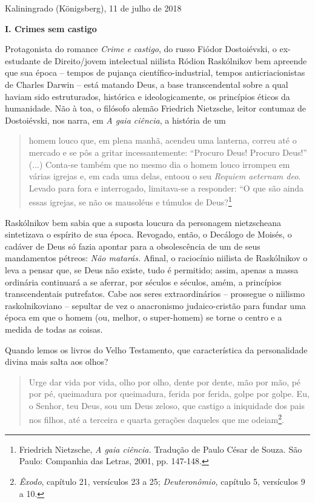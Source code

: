 \begin{flushright}
Kaliningrado (Königsberg), 11 de julho de 2018
\end{flushright}

\textbf{I. Crimes sem castigo}

Protagonista do romance \emph{Crime e castigo}, do russo Fiódor
Dostoiévski, o ex-estudante de Direito/jovem intelectual niilista Ródion
Raskólnikov bem apreende que sua época -- tempos de pujança
científico-industrial, tempos anticriacionistas de Charles Darwin --
está matando Deus, a base transcendental sobre a qual haviam sido
estruturados, histórica e ideologicamente, os princípios éticos da
humanidade. Não à toa, o filósofo alemão Friedrich Nietzsche, leitor
contumaz de Dostoiévski, nos narra, em \emph{A gaia ciência}, a história
de um

\begin{quote}
homem louco que, em plena manhã, acendeu uma lanterna, correu até o
mercado e se pôs a gritar incessantemente: ``Procuro Deus! Procuro
Deus!'' (...) Conta-se também que no mesmo dia o homem louco irrompeu em
várias igrejas e, em cada uma delas, entoou o seu \emph{Requiem aeternam
deo}. Levado para fora e interrogado, limitava-se a responder: ``O que
são ainda essas igrejas, se não os mausoléus e túmulos de
Deus?\footnote{Friedrich Nietzsche, \emph{A gaia ciência.} Tradução de
  Paulo César de Souza. São Paulo: Companhia das Letras, 2001, pp.
  147-148.}
\end{quote}

Raskólnikov bem sabia que a suposta loucura da personagem nietzscheana
sintetizava o espírito de sua época. Revogado, então, o Decálogo de
Moisés, o cadáver de Deus só fazia apontar para a obsolescência de um de
seus mandamentos pétreos: \emph{Não matarás.} Afinal, o raciocínio
niilista de Raskólnikov o leva a pensar que, se Deus não existe, tudo é
permitido; assim, apenas a massa ordinária continuará a se aferrar, por
séculos e séculos, amém, a princípios transcendentais putrefatos. Cabe
aos seres extraordinários -- prossegue o niilismo raskolnikoviano --
sepultar de vez o anacronismo judaico-cristão para fundar uma época em
que o homem (ou, melhor, o super-homem) se torne o centro e a medida de
todas as coisas.

Quando lemos os livros do Velho Testamento, que característica da
personalidade divina mais salta aos olhos?

\begin{quote}
Urge dar vida por vida, olho por olho, dente por dente, mão por mão, pé
por pé, queimadura por queimadura, ferida por ferida, golpe por golpe.
Eu, o Senhor, teu Deus, sou um Deus zeloso, que castigo a iniquidade dos
pais nos filhos, até a terceira e quarta gerações daqueles que me
odeiam\footnote{\emph{Êxodo}, capítulo 21, versículos 23 a 25;
  \emph{Deuteronômio,} capítulo 5, versículos 9 a 10.}.
\end{quote}

